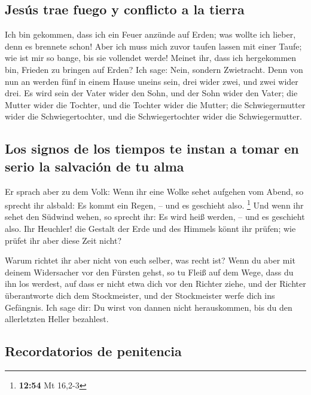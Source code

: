 \hypertarget{jesuxfas-trae-fuego-y-conflicto-a-la-tierra}{%
\subsection{Jesús trae fuego y conflicto a la
tierra}\label{jesuxfas-trae-fuego-y-conflicto-a-la-tierra}}

 Ich bin gekommen, dass ich ein Feuer anzünde auf Erden;
was wollte ich lieber, denn es brennete schon!  Aber ich
muss mich zuvor taufen lassen mit einer Taufe; wie ist mir so bange, bis
sie vollendet werde!  Meinet ihr, dass ich hergekommen
bin, Frieden zu bringen auf Erden? Ich sage: Nein, sondern Zwietracht.
 Denn von nun an werden fünf in einem Hause uneins sein,
drei wider zwei, und zwei wider drei.  Es wird sein der
Vater wider den Sohn, und der Sohn wider den Vater; die Mutter wider die
Tochter, und die Tochter wider die Mutter; die Schwiegermutter wider die
Schwiegertochter, und die Schwiegertochter wider die Schwiegermutter.

\hypertarget{los-signos-de-los-tiempos-te-instan-a-tomar-en-serio-la-salvaciuxf3n-de-tu-alma}{%
\subsection{Los signos de los tiempos te instan a tomar en serio la
salvación de tu
alma}\label{los-signos-de-los-tiempos-te-instan-a-tomar-en-serio-la-salvaciuxf3n-de-tu-alma}}

 Er sprach aber zu dem Volk: Wenn ihr eine Wolke sehet
aufgehen vom Abend, so sprecht ihr alsbald: Es kommt ein Regen, -- und
es geschieht also. \footnote{\textbf{12:54} Mt 16,2-3} 
Und wenn ihr sehet den Südwind wehen, so sprecht ihr: Es wird heiß
werden, -- und es geschieht also.  Ihr Heuchler! die
Gestalt der Erde und des Himmels könnt ihr prüfen; wie prüfet ihr aber
diese Zeit nicht?

 Warum richtet ihr aber nicht von euch selber, was recht
ist?  Wenn du aber mit deinem Widersacher vor den Fürsten
gehst, so tu Fleiß auf dem Wege, dass du ihn los werdest, auf dass er
nicht etwa dich vor den Richter ziehe, und der Richter überantworte dich
dem Stockmeister, und der Stockmeister werfe dich ins Gefängnis.
 Ich sage dir: Du wirst von dannen nicht herauskommen,
bis du den allerletzten Heller bezahlest.

\hypertarget{recordatorios-de-penitencia}{%
\subsection{Recordatorios de
penitencia}\label{recordatorios-de-penitencia}}

